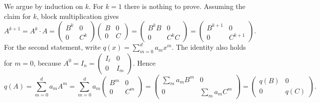 \begin{exercisesolution}
\label{sol:powers_of_block_diagonal}
We argue by induction on $k$. For $k = 1$ there is nothing to prove. Assuming the claim for $k$, block multiplication gives
\[
    A^{k+1} = A^k \cdot A = \begin{pmatrix} B^k & 0 \\ 0 & C^k \end{pmatrix} \begin{pmatrix} B & 0 \\ 0 & C \end{pmatrix} = \begin{pmatrix} B^k B & 0 \\ 0 & C^k C \end{pmatrix} = \begin{pmatrix} B^{k+1} & 0 \\ 0 & C^{k+1} \end{pmatrix}.
\]
For the second statement, write $q(x) = \sum_{m=0}^d a_m x^m$. The identity also holds for $m = 0$, because $A^0 = I_n = \left(\begin{smallmatrix} I_\ell & 0 \\ 0 & I_m \end{smallmatrix}\right)$. Hence
\[
    q(A) = \sum_{m=0}^d a_m A^m = \sum_{m=0}^d a_m \begin{pmatrix} B^m & 0 \\ 0 & C^m \end{pmatrix} = \begin{pmatrix} \sum_{m} a_m B^m & 0 \\ 0 & \sum_{m} a_m C^m \end{pmatrix} = \begin{pmatrix} q(B) & 0 \\ 0 & q(C) \end{pmatrix}.
\]
\end{exercisesolution}

